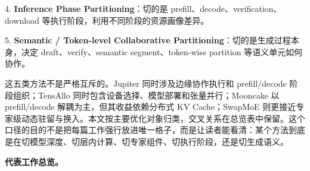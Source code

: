 \documentclass[a4paper,10pt]{ctexart}
\begin{document}
4. \textbf{Inference Phase Partitioning}：切的是 prefill、decode、verification、download 等执行阶段，利用不同阶段的资源画像差异。


5. \textbf{Semantic / Token-level Collaborative Partitioning}：切的是生成过程本身，决定 draft、verify、semantic segment、token-wise partition 等语义单元如何协作。


这五类方法不是严格互斥的。Jupiter 同时涉及边缘协作执行和 prefill/decode 阶段组织；TensAllo 同时包含设备选择、模型部署和张量并行；Mooncake 以 prefill/decode 解耦为主，但其收益依赖分布式 KV Cache；SwapMoE 则更接近专家级动态驻留与换入。本文按主要优化对象归类，交叉关系在总览表中保留。这个口径的目的不是把每篇工作强行放进唯一格子，而是让读者能看清：某个方法到底是在切模型深度、切层内计算、切专家组件、切执行阶段，还是切生成语义。


\textbf{代表工作总览。}
\end{document}
